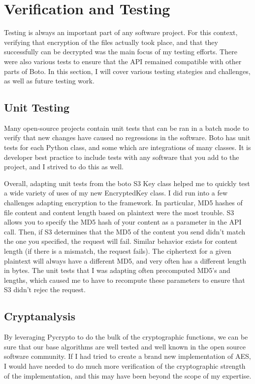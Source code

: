 \section{Verification and Testing}

Testing is always an important part of any software project. For this context, verifying that encryption of the files actually took place,
and that they successfully can be decrypted was the main focus of my testing efforts. There were also various tests to ensure that
the API remained compatible with other parts of Boto. In this section, I will cover various testing stategies and challenges, as well as future testing work.

\subsection{Unit Testing}
Many open-source projects contain unit tests that can be ran in a batch mode to verify that new changes have caused no regressions
in the software. Boto has unit tests for each Python class, and some which are integrations of many classes. It is developer best practice to include tests with any software that you add to the project, and I strived to do this as well.

Overall, adapting unit tests from the boto S3 Key class helped me to quickly test a wide variety of uses of my new EncryptedKey class.
I did run into a few challenges adapting encryption to the framework. In particular, MD5 hashes of file content and 
content length based on plaintext were the most trouble. S3 allows you to specify the MD5 hash of your content as a parameter
in the API call. Then, if S3 determines that the MD5 of the content you send didn't match the one you specified, the request will fail.
Similar behavior exists for content length (if there is a mismatch, the request fails). The ciphertext for a given plaintext will always have a different MD5, and very often has a different length in bytes. The unit tests that I was adapting often precomputed MD5's 
and lengths, which caused me to have to recompute these parameters to ensure that S3 didn't rejec the request.  

\subsection{Cryptanalysis}

By leveraging Pycrypto to do the bulk of the cryptographic functions, we can be sure that our base algorithms are 
well tested and well known in the open source software community. If I had tried to create a brand new implementation of AES,
I would have needed to do much more verification of the cryptographic strength of the implementation, and this may have been beyond
the scope of my expertise.

